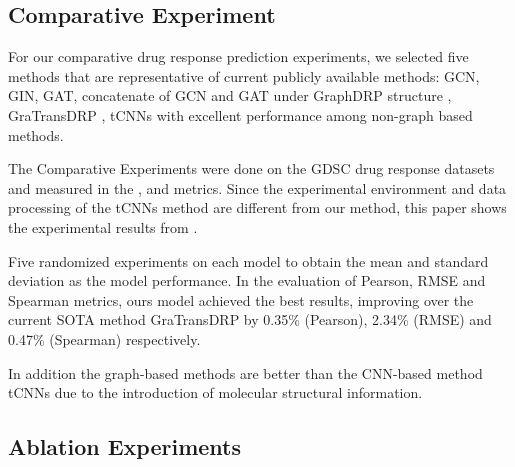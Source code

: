 \documentclass{article}
\begin{document}
 
\subsection{Comparative Experiment}




For our comparative drug response prediction experiments, we selected five methods that are representative of current publicly available methods: GCN, GIN, GAT, concatenate of GCN and GAT under GraphDRP \cite{110bGCNforDRP} structure , GraTransDRP \cite{GraTransDRP}, tCNNs \cite{tcnns} with excellent performance among non-graph based methods.

The Comparative Experiments were done on the GDSC drug response datasets and measured in the ,  and  metrics. Since the experimental environment and data processing of the tCNNs method are different from our method, this paper shows the experimental results from \cite{110bGCNforDRP}.



Five randomized experiments on each model to obtain the mean and standard deviation as the model performance.
In the evaluation of Pearson, RMSE and Spearman metrics, ours model achieved the best results, improving over the current SOTA method GraTransDRP by 0.35\% (Pearson), 2.34\% (RMSE) and 0.47\% (Spearman) respectively. 

In addition the graph-based methods  are better than the CNN-based  method  tCNNs due to the introduction of molecular  structural information. 




\subsection{Ablation Experiments}
\end{document}
